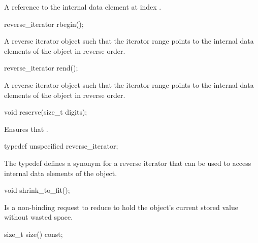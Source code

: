 \begin{addedblock}
\begin{itemdescr}
\returns A reference to the internal data element at index .
\end{itemdescr}

\begin{itemdecl}
reverse_iterator rbegin();
\end{itemdecl}

\begin{itemdescr}
\returns A reverse iterator object such that the iterator range \tcode{[crbegin(), crend())} points to the internal data elements of the  object in reverse order.
\end{itemdescr}

\begin{itemdecl}
reverse_iterator rend();
\end{itemdecl}

\begin{itemdescr}
\returns A reverse iterator object such that the iterator range \tcode{[crbegin(), crend())} points to the internal data elements of the  object in reverse order.
\end{itemdescr}

\begin{itemdecl}
void reserve(size_t digits);
\end{itemdecl}

\begin{itemdescr}
\effects Ensures that .
\end{itemdescr}

\begin{itemdecl}
typedef unspecified reverse_iterator;
\end{itemdecl}

\begin{itemdescr}
The typedef defines a synonym for a reverse iterator that can be used to access internal data elements of the  object.
\end{itemdescr}

\begin{itemdecl}
void shrink_to_fit();
\end{itemdecl}

\begin{itemdescr}
\effect Is a non-binding request to reduce  to hold the  object's current stored value without wasted space.
\end{itemdescr}

\begin{itemdecl}
size_t size() const;
\end{itemdecl}


\end{addedblock}
